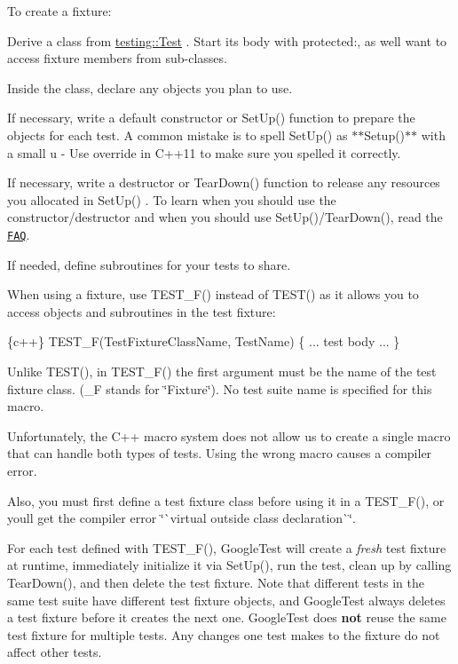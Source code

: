 To create a fixture\+:


\begin{DoxyEnumerate}
\item Derive a class from {\ttfamily \mbox{\hyperlink{classtesting_1_1Test}{testing\+::\+Test}}} . Start its body with {\ttfamily protected\+:}, as we\textquotesingle{}ll want to access fixture members from sub-\/classes.
\item Inside the class, declare any objects you plan to use.
\item If necessary, write a default constructor or {\ttfamily Set\+Up()} function to prepare the objects for each test. A common mistake is to spell {\ttfamily Set\+Up()} as $\ast$$\ast${\ttfamily Setup()}$\ast$$\ast$ with a small {\ttfamily u} -\/ Use {\ttfamily override} in C++11 to make sure you spelled it correctly.
\item If necessary, write a destructor or {\ttfamily Tear\+Down()} function to release any resources you allocated in {\ttfamily Set\+Up()} . To learn when you should use the constructor/destructor and when you should use {\ttfamily Set\+Up()/\+Tear\+Down()}, read the \href{faq.md#CtorVsSetUp}{\tt F\+AQ}.
\item If needed, define subroutines for your tests to share.
\end{DoxyEnumerate}

When using a fixture, use {\ttfamily T\+E\+S\+T\+\_\+\+F()} instead of {\ttfamily T\+E\+S\+T()} as it allows you to access objects and subroutines in the test fixture\+:


\begin{DoxyCode}
\{c++\}
TEST\_F(TestFixtureClassName, TestName) \{
  ... test body ...
\}
\end{DoxyCode}


Unlike {\ttfamily T\+E\+S\+T()}, in {\ttfamily T\+E\+S\+T\+\_\+\+F()} the first argument must be the name of the test fixture class. ({\ttfamily \+\_\+F} stands for \char`\"{}\+Fixture\char`\"{}). No test suite name is specified for this macro.

Unfortunately, the C++ macro system does not allow us to create a single macro that can handle both types of tests. Using the wrong macro causes a compiler error.

Also, you must first define a test fixture class before using it in a {\ttfamily T\+E\+S\+T\+\_\+\+F()}, or you\textquotesingle{}ll get the compiler error \char`\"{}\`{}virtual outside class
declaration\`{}\char`\"{}.

For each test defined with {\ttfamily T\+E\+S\+T\+\_\+\+F()}, Google\+Test will create a {\itshape fresh} test fixture at runtime, immediately initialize it via {\ttfamily Set\+Up()}, run the test, clean up by calling {\ttfamily Tear\+Down()}, and then delete the test fixture. Note that different tests in the same test suite have different test fixture objects, and Google\+Test always deletes a test fixture before it creates the next one. Google\+Test does {\bfseries not} reuse the same test fixture for multiple tests. Any changes one test makes to the fixture do not affect other tests.

